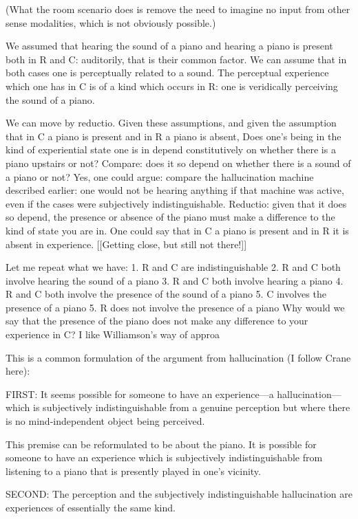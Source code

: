 \documentclass[sloppy, journal, git, bytitle, dodraft]{humapap}
\begin{document}
(What the room scenario does is remove the need to imagine no input from other sense modalities, which is not obviously possible.)

We assumed that hearing the sound of a piano and hearing a piano is present both in R and C: auditorily, that is their common factor. We can assume that in both cases one is perceptually related to a sound. The perceptual experience which one has in C is of a kind which occurs in R: one is veridically perceiving the sound of a piano. 

We can move by reductio. Given these assumptions, and given the assumption that in C a piano is present and in R a piano is absent, Does one's being in the kind of experiential state one is in depend constitutively on whether there is a piano upstairs or not? 
Compare: does it so depend on whether there is a sound of a piano or not? Yes, one could argue: compare the hallucination machine described earlier: one would not be hearing anything if that machine was active, even if the cases were subjectively indistinguishable. 
Reductio: given that it does so depend, the presence or absence of the piano must make a difference to the kind of state you are in. One could say that in C a piano is present and in R it is absent in experience. [[Getting close, but still not there!]]

Let me repeat what we have:
1. R and C are indistinguishable
2. R and C both involve hearing the sound of a piano
3. R and C both involve hearing a piano
4. R and C both involve the presence of the sound of a piano
5. C involves the presence of a piano
5. R does not involve the presence of a piano
Why would we say that the presence of the piano does not make any difference to your experience in C? I like Williamson's way of approa


This is a common formulation of the argument from hallucination (I follow Crane here): 

FIRST: It seems possible for someone to have an experience—a hallucination—which is subjectively indistinguishable from a genuine perception but where there is no mind-independent object being perceived.

This premise can be reformulated to be about the piano. It is possible for someone to have an experience which is subjectively indistinguishable from listening to a piano that is presently played in one's vicinity. 

SECOND: The perception and the subjectively indistinguishable hallucination are experiences of essentially the same kind.
\end{document}
